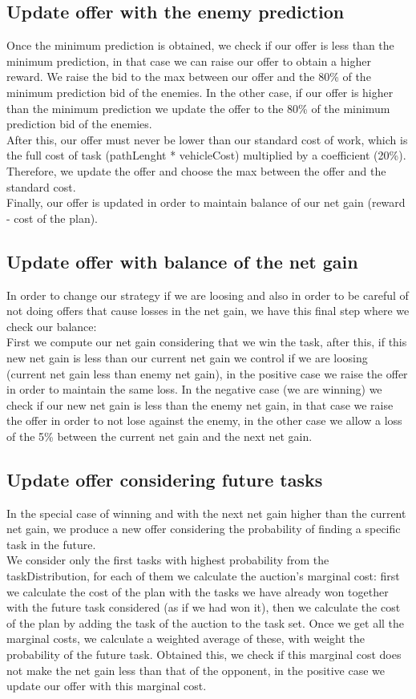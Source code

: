 \documentclass[11pt]{article}
\begin{document}
\subsection{Update offer with the enemy prediction}
Once the minimum prediction is obtained, we check if our offer is less than the minimum prediction, in that case we can raise our offer to obtain a higher reward. We raise the bid to the max between our offer and the 80\% of the minimum prediction bid of the enemies. In the other case, if our offer is higher than the minimum prediction we update the offer to the 80\% of the minimum prediction bid of the enemies.
\\
After this, our offer must never be lower than our standard cost of work, which is the full cost of task (pathLenght * vehicleCost) multiplied by a coefficient (20\%). Therefore, we update the offer and choose the max between the offer and the standard cost. 
\\
Finally, our offer is updated in order to maintain balance of our net gain (reward - cost of the plan).

\subsection{Update offer with balance of the net gain}
In order to change our strategy if we are loosing and also in order to be careful of not doing offers that cause losses in the net gain, we have this final step where we check our balance:
\\
First we compute our net gain considering that we win the task, after this, if this new net gain is less than our current net gain we control if we are loosing (current net gain less than enemy net gain), in the positive case we raise the offer in order to maintain the same loss.
In the negative case (we are winning) we check if our new net gain is less than the enemy net gain, in that case we raise the offer in order to not lose against the enemy, in the other case we allow a loss of the 5\% between the current net gain and the next net gain.

\subsection{Update offer considering future tasks}
In the special case of winning and with the next net gain higher than the current net gain, we produce a new offer considering the probability of finding a specific task in the future.
\\
We consider only the first tasks with highest probability from the taskDistribution, for each of them we calculate the auction's marginal cost: first we calculate the cost of the plan with the tasks we have already won together with the future task considered (as if we had won it), then we calculate the cost of the plan by adding the task of the auction to the task set. Once we get all the marginal costs, we calculate a weighted average of these, with weight the probability of the future task.
Obtained this, we check if this marginal cost does not make the net gain less than that of the opponent, in the positive case we update our offer with this marginal cost.
\end{document}
